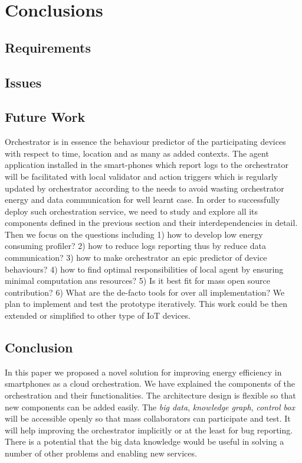 \chapter{Conclusions}
\section{Requirements}
\section{Issues}
\section{Future Work}
Orchestrator is in essence the behaviour predictor of the participating devices with respect to time, location and as many as added contexts. The agent application installed in the smart-phones which report logs to the orchestrator will be facilitated with local validator and action triggers which is regularly updated by orchestrator according to the needs to avoid wasting orchestrator energy and data communication for well learnt case. In order to successfully deploy such orchestration service, we need to study and explore all its components defined in the previous section and their interdependencies in detail.  Then we focus on the questions including 1) how to develop low energy consuming profiler? 2) how to reduce logs reporting thus by reduce data communication? 3) how to make orchestrator an epic predictor of device behaviours? 4) how to find optimal responsibilities of local agent by ensuring minimal computation ans resources? 5) Is it best fit for mass open source contribution? 6) What are the de-facto tools for over all implementation? We plan to implement and test the prototype iteratively. This work could be then extended or simplified to other type of IoT devices.
\section{Conclusion}
In this paper we proposed a novel solution for improving energy efficiency in smartphones as a cloud orchestration. We have explained the components of the orchestration and their functionalities. The architecture design is flexible so that new components can be added easily. The \emph{big data}, \emph{knowledge graph}, \emph{control box} will be accessible openly so that mass collaborators can participate and test. It will help improving the orchestrator implicitly or at the least for bug reporting. There is a potential that the big data knowledge would be useful in solving a number of other problems and enabling new services.
